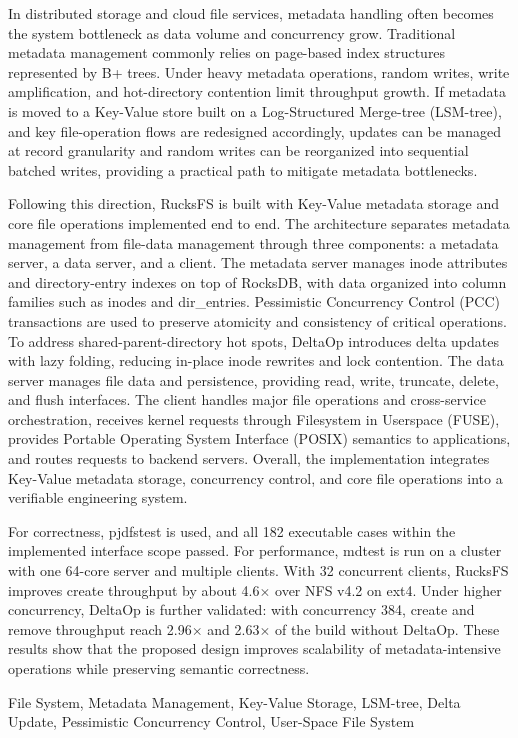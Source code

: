\abstracten

In distributed storage and cloud file services, metadata handling often becomes the system bottleneck as data volume and concurrency grow. Traditional metadata management commonly relies on page-based index structures represented by B+ trees. Under heavy metadata operations, random writes, write amplification, and hot-directory contention limit throughput growth. If metadata is moved to a Key-Value store built on a Log-Structured Merge-tree (LSM-tree), and key file-operation flows are redesigned accordingly, updates can be managed at record granularity and random writes can be reorganized into sequential batched writes, providing a practical path to mitigate metadata bottlenecks.

Following this direction, RucksFS is built with Key-Value metadata storage and core file operations implemented end to end. The architecture separates metadata management from file-data management through three components: a metadata server, a data server, and a client. The metadata server manages inode attributes and directory-entry indexes on top of RocksDB, with data organized into column families such as inodes and dir\_entries. Pessimistic Concurrency Control (PCC) transactions are used to preserve atomicity and consistency of critical operations. To address shared-parent-directory hot spots, DeltaOp introduces delta updates with lazy folding, reducing in-place inode rewrites and lock contention. The data server manages file data and persistence, providing read, write, truncate, delete, and flush interfaces. The client handles major file operations and cross-service orchestration, receives kernel requests through Filesystem in Userspace (FUSE), provides Portable Operating System Interface (POSIX) semantics to applications, and routes requests to backend servers. Overall, the implementation integrates Key-Value metadata storage, concurrency control, and core file operations into a verifiable engineering system.

For correctness, pjdfstest is used, and all 182 executable cases within the implemented interface scope passed. For performance, mdtest is run on a cluster with one 64-core server and multiple clients. With 32 concurrent clients, RucksFS improves create throughput by about 4.6$\times$ over NFS v4.2 on ext4. Under higher concurrency, DeltaOp is further validated: with concurrency 384, create and remove throughput reach 2.96$\times$ and 2.63$\times$ of the build without DeltaOp. These results show that the proposed design improves scalability of metadata-intensive operations while preserving semantic correctness.

\vspace{5pt}

\keywordsen File System, Metadata Management, Key-Value Storage, LSM-tree, Delta Update, Pessimistic Concurrency Control, User-Space File System
